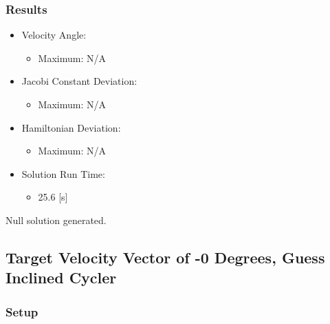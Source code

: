 \documentclass{article}
\begin{document}
\subsubsection{Results}

\begin{itemize}
    \item Velocity Angle:
    \begin{itemize}
        \item Maximum: N/A
    \end{itemize}
    \item Jacobi Constant Deviation:
    \begin{itemize}
        \item Maximum: N/A
    \end{itemize}
    \item Hamiltonian Deviation:
    \begin{itemize}
        \item Maximum: N/A
    \end{itemize}
    \item Solution Run Time:
    \begin{itemize}
        \item 25.6 [s]
    \end{itemize}  
\end{itemize}

Null solution generated.

\newpage

\subsection{Target Velocity Vector of -0 Degrees, Guess Inclined Cycler}

\subsubsection{Setup}
\end{document}
